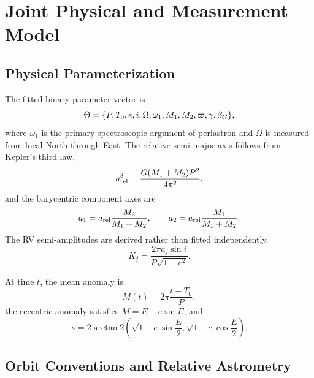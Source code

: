 \section{Joint Physical and Measurement Model}
\label{sect:model}

\subsection{Physical Parameterization}

The fitted binary parameter vector is
\begin{equation}
\Theta=\{P,T_0,e,i,\Omega,\omega_1,M_1,M_2,\varpi,\gamma,\beta_G\},
\label{eq:theta}
\end{equation}
where $\omega_1$ is the primary spectroscopic argument of periastron and $\Omega$ is measured from local North through East. The relative semi-major axis follows from Kepler's third law,
\begin{equation}
a_{\rm rel}^3=\frac{G(M_1+M_2)P^2}{4\pi^2},
\end{equation}
and the barycentric component axes are
\begin{equation}
a_1=a_{\rm rel}\frac{M_2}{M_1+M_2},\qquad
a_2=a_{\rm rel}\frac{M_1}{M_1+M_2}.
\end{equation}
The RV semi-amplitudes are derived rather than fitted independently,
\begin{equation}
K_j=\frac{2\pi a_j\sin i}{P\sqrt{1-e^2}}.
\end{equation}

At time $t$, the mean anomaly is
\begin{equation}
M(t)=2\pi\frac{t-T_0}{P},
\end{equation}
the eccentric anomaly satisfies $M=E-e\sin E$, and
\begin{equation}
\nu=2\arctan2\!\left(\sqrt{1+e}\sin\frac{E}{2},
\sqrt{1-e}\cos\frac{E}{2}\right).
\end{equation}

\subsection{Orbit Conventions and Relative Astrometry}

